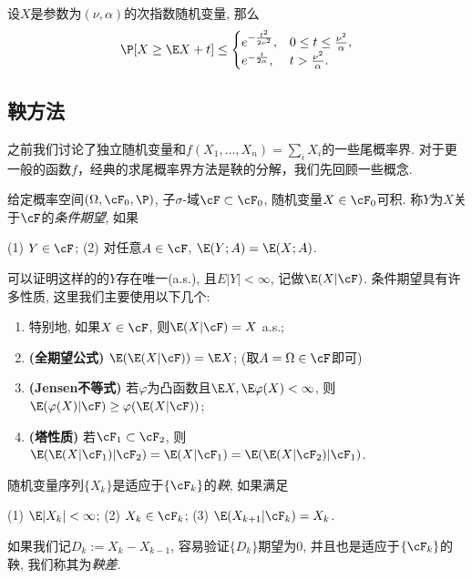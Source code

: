 \begin{theorem}[次指数随机变量的上偏差不等式]\label{thm:UpperDeviationOfSubExpRV}
	设$X$是参数为$(\nu, \alpha)$的次指数随机变量, 那么
	\begin{equation*}
		\P[X \geq \E X + t] \leq 
		\begin{cases}
			e^{-\frac{t^2}{2 \nu^2}}, & 0 \leq t \leq \frac{\nu^2}{\alpha}, \\
			e^{-\frac{t}{2 \alpha}}, & t > \frac{\nu^2}{\alpha}.
		\end{cases}
	\end{equation*}
\end{theorem}



\subsection{鞅方法}

之前我们讨论了独立随机变量和$f(X_1, \dots, X_n) = \sum_i X_i$的一些尾概率界. 对于更一般的函数$f$，经典的求尾概率界方法是鞅的分解，我们先回顾一些概念. 

给定概率空间$(\Omega, \cF_0, \P)$, 子$\sigma$-域$\cF \subset \cF_0$, 随机变量$X \in \cF_0$可积. 
称$Y$为$X$关于$\cF$的\emph{条件期望}, 如果
\begin{center}
	(1) $Y \in \cF$; \quad
	(2) 对任意$A \in \cF$, $\E(Y;A) = \E(X;A)$. 
\end{center}
可以证明这样的的$Y$存在唯一(a.s.), 且$E|Y| < \infty$, 记做$\E(X|\cF)$. 
条件期望具有许多性质, 这里我们主要使用以下几个: 
	\begin{enumerate}[label=(\roman*)]
		\item 特别地, 如果$X \in \cF$, 则$\E(X|\cF) = X$ a.s.;
		\item \textbf{(全期望公式)} $\E(\E(X|\cF)) = \E X$; (取$A = \Omega \in \cF$即可)
		\item \textbf{(Jensen不等式)} 若$\varphi$为凸函数且$\E X, \E \varphi(X) < \infty$, 则$\E(\varphi(X) | \cF) \geq \varphi(\E(X|\cF))$; 
		\item \textbf{(塔性质)} 若$\cF_1 \subset \cF_2$, 则$\E(\E(X|\cF_1)|\cF_2) = \E(X|\cF_1) = \E(\E(X|\cF_2)|\cF_1)$. 
	\end{enumerate}
随机变量序列$\{X_k\}$是适应于$\{\cF_k\}$的\emph{鞅}, 如果满足
\begin{center}
	(1) $\E |X_k| < \infty$; \quad
	(2) $X_k \in \cF_k$; \quad
	(3) $\E(X_{k+1}|\cF_k) = X_k$.
\end{center}
如果我们记$D_k := X_k - X_{k-1}$, 容易验证$\{D_k\}$期望为$0$, 并且也是适应于$\{\cF_k\}$的鞅, 我们称其为\emph{鞅差}. 


